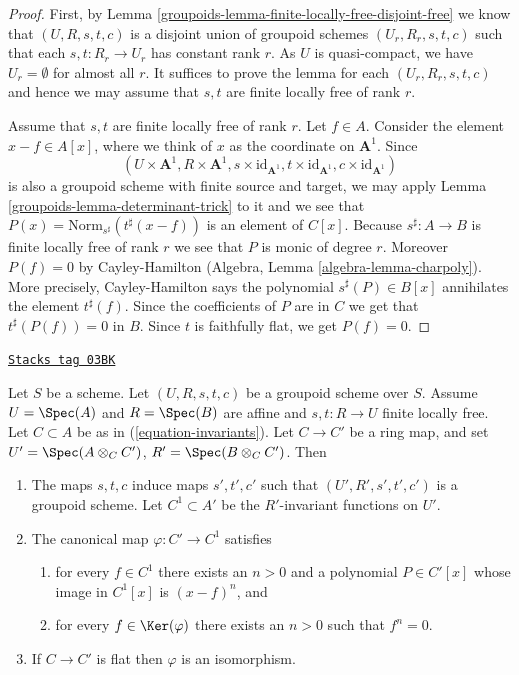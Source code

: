 \begin{proof}

First, by Lemma \ref{groupoids-lemma-finite-locally-free-disjoint-free}
we know that $(U, R, s, t, c)$ is a disjoint union
of groupoid schemes $(U_r, R_r, s, t, c)$ such that each $s, t : R_r \to U_r$
has constant rank $r$. As $U$ is quasi-compact, we have $U_r = \emptyset$ for
almost all $r$. It suffices to prove the lemma for each $(U_r, R_r, s, t, c)$
and hence we may assume that $s, t$ are finite locally free of rank $r$.

\medskip\noindent
Assume that $s, t$ are finite locally free of rank $r$.
Let $f \in A$. Consider the element $x - f \in A[x]$, where we think
of $x$ as the coordinate on $\mathbf{A}^1$.
Since
$$
(U \times \mathbf{A}^1, R \times \mathbf{A}^1,
s \times \text{id}_{\mathbf{A}^1},
t \times \text{id}_{\mathbf{A}^1},
c \times \text{id}_{\mathbf{A}^1})
$$
is also a groupoid scheme with finite source and target, we may apply
Lemma \ref{groupoids-lemma-determinant-trick} to it and we see that
$P(x) = \text{Norm}_{s^\sharp}(t^\sharp(x - f))$
is an element of $C[x]$. Because $s^\sharp : A \to B$ is finite locally
free of rank $r$ we see that $P$ is monic of degree $r$.
Moreover $P(f) = 0$ by Cayley-Hamilton
(Algebra, Lemma \ref{algebra-lemma-charpoly}).
More precisely, Cayley-Hamilton says the polynomial
$s^\sharp(P) \in B[x]$ annihilates the element $t^\sharp(f)$.
Since the coefficients of $P$ are in $C$ we get that
$t^\sharp(P(f)) = 0$ in $B$. Since $t$ is faithfully flat,
we get $P(f) = 0$.
\end{proof}

\begin{lemma}
\label{groupoids-lemma-invariants-base-change}
\href{https://stacks.math.columbia.edu/tag/03BK}{\texttt{Stacks tag 03BK}}

Let $S$ be a scheme. Let $(U, R, s, t, c)$ be a groupoid scheme over $S$.
Assume $U = \Spec(A)$ and $R = \Spec(B)$ are affine and
$s, t : R \to U$ finite locally free. Let $C \subset A$ be as in
(\ref{equation-invariants}). Let $C \to C'$ be a ring map, and set
$U' = \Spec(A \otimes_C C')$,
$R' = \Spec(B \otimes_C C')$.
Then
\begin{enumerate}
\item The maps $s, t, c$ induce maps $s', t', c'$ such that
$(U', R', s', t', c')$ is a groupoid scheme. Let $C^1 \subset A'$
be the $R'$-invariant functions on $U'$.
\item The canonical map $\varphi : C' \to C^1$ satisfies
\begin{enumerate}
\item for every $f \in C^1$ there exists an $n > 0$ and a
polynomial $P \in C'[x]$ whose image in $C^1[x]$ is
$(x - f)^n$, and
\item for every $f \in \Ker(\varphi)$ there exists
an $n > 0$ such that $f^n = 0$.
\end{enumerate}
\item If $C \to C'$ is flat then $\varphi$ is an isomorphism.
\end{enumerate}
\end{lemma}

